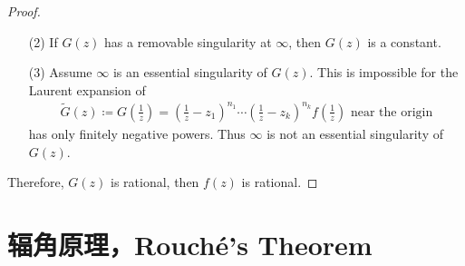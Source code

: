 \begin{thm}
\begin{proof}
\begin{enumerate}
				\item[(2)]If $G(z)$ has a removable singularity at $\infty$, then $G(z)$ is a constant.
				
				\vspace{1em}
				
				\item[(3)]Assume $\infty$ is an essential singularity of $G(z)$. This is impossible for the Laurent expansion of 
				\begin{align}
					\widetilde{G}(z) \coloneqq G(\frac{1}{z}) = (\frac{1}{z} - z_1)^{n_1} \cdots (\frac{1}{z} - z_k)^{n_k} f(\frac{1}{z}) \,\, \text{near the origin}
				\end{align}
				has only finitely negative powers. Thus $\infty$ is not an essential singularity of $G(z)$.
			\end{enumerate}
		
			\vspace{1em}
			
			Therefore, $G(z)$ is rational, then $f(z)$ is rational.
		\end{proof}
	\end{thm}

\newpage
\section{辐角原理，Rouch\'{e}'s Theorem}
